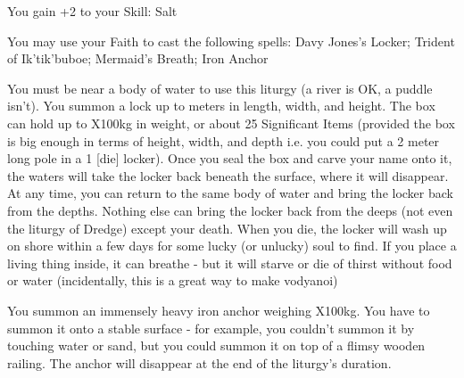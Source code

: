 {\GOD[
Name=Ik'tik'buboe,
Link=small-god-ik'tik'buboe,
GodOf=The Drowned Sultan,
Holy=a necklace made from crab's claws and nautical rope tied in elaborate knots
]


You gain +2 to your Skill: Salt


You may use your Faith to cast the following spells: Davy Jones's Locker; Trident of Ik'tik'buboe; Mermaid's Breath; Iron Anchor

\LITURGY [
  Name= Davy Jones-Locker,
  Link= ikitikbubuoe-liturgy-davy-jones-locker,
  Paradigm= Prophesy ,
  Save=  N ,
  Duration= 0 ,
  Counter=  n/a  ,
  Keywords= None ,
  Target=   Close body of water
]



You must be near a body of water to use this liturgy (a river is OK, a puddle isn't).  You summon a lock up to \DICE meters in length, width, and height.  The box can hold up to \DICE X100kg in weight, or about 25 Significant Items (provided the box is big enough in terms of height, width, and depth i.e. you could put a 2 meter long pole in a 1 [die] locker).  Once you seal the box and carve your name onto it, the waters will take the locker back beneath the surface, where it will disappear.  At any time, you can return to the same body of water and bring the locker back from the depths. Nothing else can bring the locker back from the deeps (not even the liturgy of Dredge) except your death.  When you die, the locker will wash up on shore within a few days for some lucky (or unlucky) soul to find.
If you place a living thing inside, it can breathe - but it will starve or die of thirst without food or water (incidentally, this is a great way to make vodyanoi)
\LITURGY [
  Name= Iron Anchor,
  Link=ikitikbubuoe-liturgy-liturgy-iron-anchor,
  Paradigm= Force ,
  Save=  N ,
  Duration= \SUMDICE Minutes ,
  Counter=  n/a  ,
  Keywords= None ,
  Target=   Close (touch)
]



You summon an immensely heavy iron anchor weighing \DICE X100kg.  You have to summon it onto a stable surface - for example, you couldn't summon it by touching water or sand, but you could summon it on top of a flimsy wooden railing.  The anchor will disappear at the end of the liturgy's duration.
\LITURGY [
  Name= Mermaid's Breath,
  Link=ikitikbubuoe-liturgy-liturgy-mermaids-breath,
  Paradigm= Biomancy ,
  Save=  Y (negates) ,
  Duration= \SUMDICE Minutes ,
  Counter=  n/a  ,
  Keywords= Splittable ,
  Target=   Self / Close (touch)
]



}
